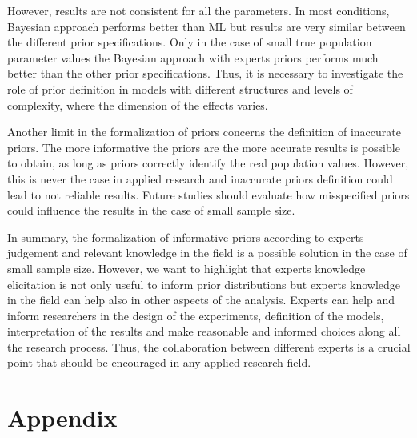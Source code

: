 \documentclass[graybox]{svmult}
\begin{document}
However, results are not consistent for all the parameters. In most conditions, Bayesian approach performs better than ML but results are very similar between the different prior specifications. Only in the case of small true population parameter values the Bayesian approach with experts priors performs much better than the other prior specifications. Thus, it is necessary to investigate the role of prior definition in models with different structures and levels of complexity, where the dimension of the effects varies.

Another limit in the formalization of priors concerns the definition of inaccurate priors. The more informative the priors are the more accurate results is possible to obtain, as long as priors correctly identify the real population values. However, this is never the case in applied research and inaccurate priors definition could lead to not reliable results. Future studies should evaluate how misspecified priors could influence the results in the case of small sample size. 

In summary, the formalization of informative priors according to experts judgement and relevant knowledge in the field is a possible solution in the case of small sample size. However, we want to highlight that experts knowledge elicitation is not only useful to inform prior distributions but experts knowledge in the field can help also in other aspects of the analysis. Experts can help and inform researchers in the design of the experiments, definition of the models, interpretation of the results and make reasonable and informed choices along all the research process. Thus, the collaboration between different experts is a crucial point that should be encouraged in any applied research field.

\clearpage 

\section*{Appendix}
\label{sec: apendix}
\end{document}
